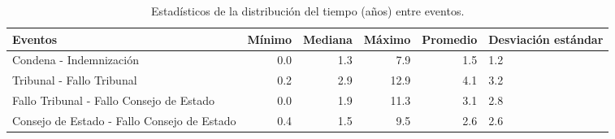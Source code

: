 \begin{table}[htbp]
\centering
\caption{Estadísticos de la distribución del
tiempo (años) entre eventos.} 
\label{tab:eventos-otros}
\begin{tabular}{p{6cm}rrrrR{2cm}}
  \hline
Eventos & Mínimo & Mediana & Máximo & Promedio & Desviación estándar \\ 
  \hline
Condena - Indemnización & 0.0 & 1.3 & 7.9 & 1.5 & 1.2 \\ 
  Tribunal - Fallo Tribunal & 0.2 & 2.9 & 12.9 & 4.1 & 3.2 \\ 
  Fallo Tribunal - Fallo Consejo de Estado & 0.0 & 1.9 & 11.3 & 3.1 & 2.8 \\ 
  Consejo de Estado - Fallo Consejo de Estado & 0.4 & 1.5 & 9.5 & 2.6 & 2.6 \\ 
   \hline
\end{tabular}
\end{table}
